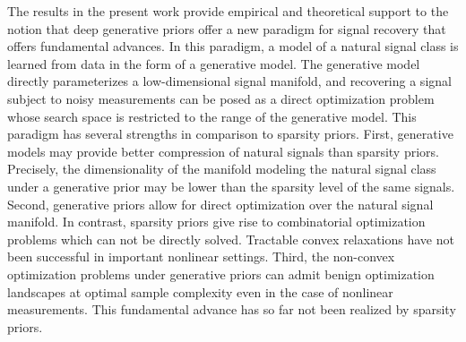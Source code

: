 \documentclass[11pt]{article}
\theoremstyle{remark}
\begin{document}

The results in the present work provide  empirical and theoretical support to the notion that deep generative priors offer a new paradigm for signal recovery that offers fundamental advances.  In this paradigm, a model of a natural signal class is learned from data in the form of a generative model. The generative model directly parameterizes a low-dimensional signal manifold, and recovering a signal subject to noisy measurements can be posed as a direct optimization problem whose search space is restricted to the range of the generative model.  This paradigm has several strengths in comparison to sparsity priors.  First, generative models may provide better compression of natural signals than sparsity priors.  Precisely, the dimensionality of the manifold modeling the natural signal class under a generative prior may be lower than the sparsity level of the same signals. Second, generative priors allow for direct optimization over the natural signal manifold.  In contrast, sparsity priors give rise to combinatorial optimization problems which can not be directly solved.  Tractable convex relaxations have not been successful in important nonlinear settings.  Third, the non-convex optimization problems under generative priors can admit benign optimization landscapes at optimal sample complexity even in the case of nonlinear measurements.  This fundamental advance has so far not been realized by sparsity priors.  
\end{document}

